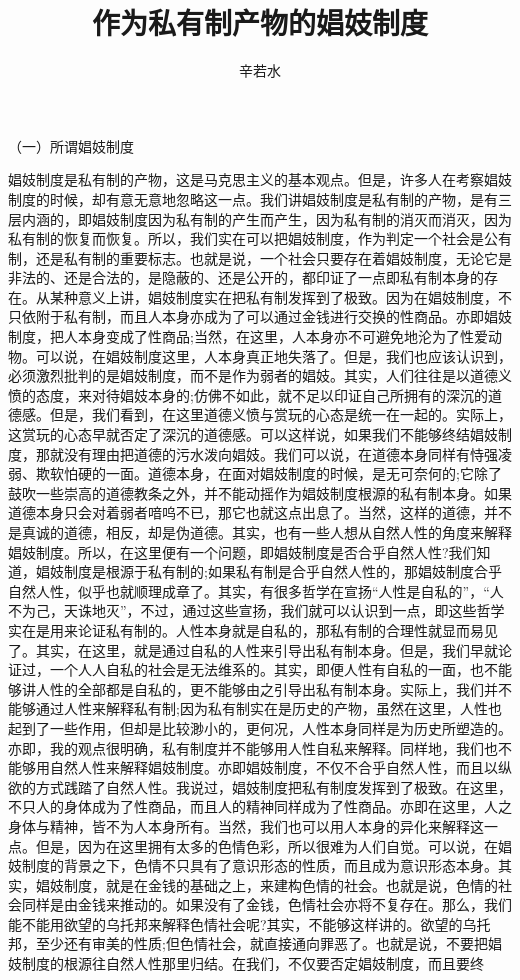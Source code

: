 \documentclass[
    a4paper
    ]{article}
\date{}
\author{辛若水}
\title{\zihao{-2}\heiti\textbf{作为私有制产物的娼妓制度}}
\begin{document}
    \maketitle

（一）所谓娼妓制度

娼妓制度是私有制的产物，这是马克思主义的基本观点。但是，许多人在考察娼妓制度的时候，却有意无意地忽略这一点。我们讲娼妓制度是私有制的产物，是有三层内涵的，即娼妓制度因为私有制的产生而产生，因为私有制的消灭而消灭，因为私有制的恢复而恢复。所以，我们实在可以把娼妓制度，作为判定一个社会是公有制，还是私有制的重要标志。也就是说，一个社会只要存在着娼妓制度，无论它是非法的、还是合法的，是隐蔽的、还是公开的，都印证了一点即私有制本身的存在。从某种意义上讲，娼妓制度实在把私有制发挥到了极致。因为在娼妓制度，不只依附于私有制，而且人本身亦成为了可以通过金钱进行交换的性商品。亦即娼妓制度，把人本身变成了性商品;当然，在这里，人本身亦不可避免地沦为了性爱动物。可以说，在娼妓制度这里，人本身真正地失落了。但是，我们也应该认识到，必须激烈批判的是娼妓制度，而不是作为弱者的娼妓。其实，人们往往是以道德义愤的态度，来对待娼妓本身的;仿佛不如此，就不足以印证自己所拥有的深沉的道德感。但是，我们看到，在这里道德义愤与赏玩的心态是统一在一起的。实际上，这赏玩的心态早就否定了深沉的道德感。可以这样说，如果我们不能够终结娼妓制度，那就没有理由把道德的污水泼向娼妓。我们可以说，在道德本身同样有恃强凌弱、欺软怕硬的一面。道德本身，在面对娼妓制度的时候，是无可奈何的;它除了鼓吹一些崇高的道德教条之外，并不能动摇作为娼妓制度根源的私有制本身。如果道德本身只会对着弱者喑呜不已，那它也就这点出息了。当然，这样的道德，并不是真诚的道德，相反，却是伪道德。其实，也有一些人想从自然人性的角度来解释娼妓制度。所以，在这里便有一个问题，即娼妓制度是否合乎自然人性?我们知道，娼妓制度是根源于私有制的;如果私有制是合乎自然人性的，那娼妓制度合乎自然人性，似乎也就顺理成章了。其实，有很多哲学在宣扬“人性是自私的”，“人不为己，天诛地灭”，不过，通过这些宣扬，我们就可以认识到一点，即这些哲学实在是用来论证私有制的。人性本身就是自私的，那私有制的合理性就显而易见了。其实，在这里，就是通过自私的人性来引导出私有制本身。但是，我们早就论证过，一个人人自私的社会是无法维系的。其实，即便人性有自私的一面，也不能够讲人性的全部都是自私的，更不能够由之引导出私有制本身。实际上，我们并不能够通过人性来解释私有制;因为私有制实在是历史的产物，虽然在这里，人性也起到了一些作用，但却是比较渺小的，更何况，人性本身同样是为历史所塑造的。亦即，我的观点很明确，私有制度并不能够用人性自私来解释。同样地，我们也不能够用自然人性来解释娼妓制度。亦即娼妓制度，不仅不合乎自然人性，而且以纵欲的方式践踏了自然人性。我说过，娼妓制度把私有制度发挥到了极致。在这里，不只人的身体成为了性商品，而且人的精神同样成为了性商品。亦即在这里，人之身体与精神，皆不为人本身所有。当然，我们也可以用人本身的异化来解释这一点。但是，因为在这里拥有太多的色情色彩，所以很难为人们自觉。可以说，在娼妓制度的背景之下，色情不只具有了意识形态的性质，而且成为意识形态本身。其实，娼妓制度，就是在金钱的基础之上，来建构色情的社会。也就是说，色情的社会同样是由金钱来推动的。如果没有了金钱，色情社会亦将不复存在。那么，我们能不能用欲望的乌托邦来解释色情社会呢?其实，不能够这样讲的。欲望的乌托邦，至少还有审美的性质;但色情社会，就直接通向罪恶了。也就是说，不要把娼妓制度的根源往自然人性那里归结。在我们，不仅要否定娼妓制度，而且要终
\end{document}
